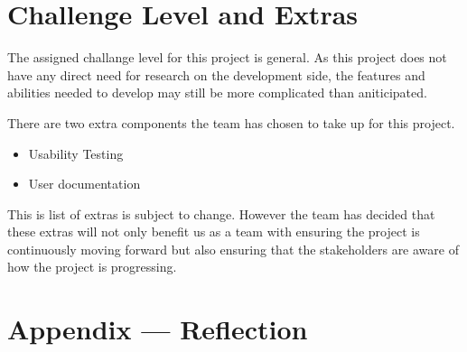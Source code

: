 \documentclass{article}
\begin{document}
\section{Challenge Level and Extras}

The assigned challange level for this project is general. As this project does
not have any direct need for research on the development side, the features and
abilities needed to develop may still be more complicated than aniticipated. 

\noindent There are two extra components the team has chosen to take up for this
project. 
\begin{itemize}
    \item Usability Testing
    \item User documentation
\end{itemize}
This is list of extras is subject to change. However the team has decided that
these extras will not only benefit us as a team with ensuring the project is
continuously moving forward but also ensuring that the stakeholders are aware of
how the project is progressing.

\newpage{}

\section*{Appendix --- Reflection}
\end{document}
